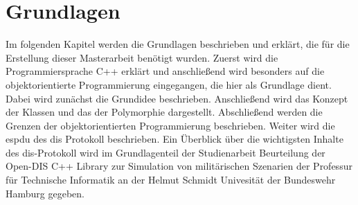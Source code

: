 \chapter{Grundlagen}\label{grundlagen}

Im folgenden Kapitel werden die Grundlagen beschrieben und erklärt, die für die Erstellung  dieser Masterarbeit benötigt wurden. Zuerst wird die Programmiersprache C++ erklärt und anschließend wird besonders auf die objektorientierte Programmierung eingegangen, die hier als Grundlage dient. Dabei wird zunächst die Grundidee beschrieben. Anschließend wird das Konzept der Klassen und das der Polymorphie dargestellt. Abschließend werden die Grenzen der objektorientierten Programmierung beschrieben.  Weiter wird  die \ac{espdu} des \ac{dis} Protokoll beschrieben. Ein Überblick über die wichtigsten Inhalte des \ac{dis}-Protokoll wird im Grundlagenteil der Studienarbeit \glqq Beurteilung der Open-DIS C++ Library zur Simulation von militärischen Szenarien\grqq{}\cite{HenryWinkel.} der Professur für Technische Informatik an der Helmut Schmidt Univesität der Bundeswehr Hamburg gegeben.


